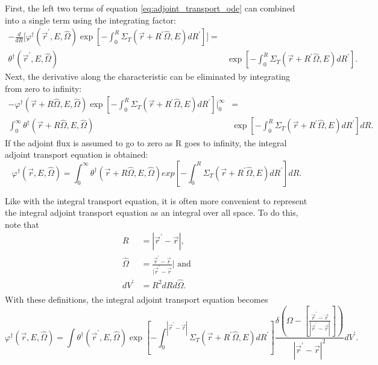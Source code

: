 First, the left two terms of equation \ref{eq:adjoint_transport_ode} can
combined into a single term using the integrating factor:
\begin{align}
  -\frac{d}{dR}\bigg[\varphi^{\dagger}(\vec{r}^{'},E,\hat{\Omega})
    \exp{\left[-\int_0^R \Sigma_T(\vec{r}+R^{'}\hat{\Omega},E)dR^{'}\right]}
    \bigg] = \nonumber \\
  \theta^{\dagger}(\vec{r}^{'},E,\hat{\Omega})
  &\exp{\left[-\int_0^R \Sigma_T(\vec{r}+R^{'}\hat{\Omega},E)dR^{'} \right]}.
  \nonumber
\end{align}
Next, the derivative along the characteristic can be eliminated by integrating
from zero to infinity:
\begin{align}
  -\varphi^{\dagger}(\vec{r} + R\hat{\Omega},E,\hat{\Omega})
  \exp{\left[-\int_0^R \Sigma_T(\vec{r}+R^{'}\hat{\Omega},E)dR^{'}\right]}
  \bigg|_0^{\infty} & = \nonumber \\
  \int_0^{\infty} 
  \theta^{\dagger}(\vec{r} + R\hat{\Omega},E,\hat{\Omega})
  &\exp{\left[-\int_0^R \Sigma_T(\vec{r}+R^{'}\hat{\Omega},E)dR^{'} \right]} dR.
  \nonumber 
\end{align}
If the adjoint flux is assumed to go to zero as R goes to infinity, the integral
adjoint transport equation is obtained:
\begin{equation}
    \varphi^{\dagger}(\vec{r},E,\hat{\Omega}) = 
    \int_0^{\infty} \theta^{\dagger}(\vec{r} + R\hat{\Omega},E,\hat{\Omega})
    exp\left[-\int_0^R \Sigma_T(\vec{r}+R^{'}\hat{\Omega},E)dR^{'} \right] dR.
  \label{eq:line_integral_adj_transport_eqn}
\end{equation}

Like with the integral transport equation, it is often more convenient to 
represent the integral adjoint transport equation as an integral over all space.
To do this, note that
\begin{align}
  R & = |\vec{r}^{'} - \vec{r}|, \nonumber \\
  \hat{\Omega} & = \frac{\vec{r}^{'} - \vec{r}}{|\vec{r}^{'} - \vec{r}}| 
  \text{ and} \nonumber \\
  dV^{'} & = R^2dRd\hat{\Omega}. \nonumber \\
\end{align}
With these definitions, the integral adjoint transport equation becomes
\begin{equation*}
    \varphi^{\dagger}(\vec{r},E,\hat{\Omega}) = 
    \int \theta^{\dagger}(\vec{r}^{'},E,\hat{\Omega})
    \exp{\left[-\int_0^{|\vec{r}^{'} - \vec{r}|} 
      \Sigma_T(\vec{r}+R^{'}\hat{\Omega},E)dR^{'} \right]}
    \frac{\delta \left(\Omega - \left[\frac{\vec{r}^{'} - \vec{r}}
        {|\vec{r}^{'} - \vec{r}|}\right]\right)}
    {|\vec{r}^{'} - \vec{r}|^2} dV^{'}.
\end{equation*}

